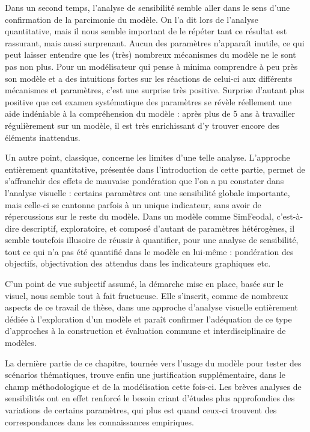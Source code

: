 Dans un second temps, l'analyse de sensibilité semble aller dans le sens d'une confirmation de la parcimonie du modèle.
On l'a dit lors de l'analyse quantitative, mais il nous semble important de le répéter tant ce résultat est rassurant, mais aussi surprenant.
Aucun des paramètres n'apparaît inutile, ce qui peut laisser entendre que les (très) nombreux mécanismes du modèle ne le sont pas non plus.
Pour un modélisateur qui pense à minima comprendre à peu près son modèle et a des intuitions fortes sur les réactions de celui-ci aux différents mécanismes et paramètres, c'est une surprise très positive.
Surprise d'autant plus positive que cet examen systématique des paramètres se révèle réellement une aide indéniable à la compréhension du modèle : après plus de 5 ans à travailler régulièrement sur un modèle, il est très enrichissant d'y trouver encore des éléments inattendus.

Un autre point, classique, concerne les limites d'une telle analyse.
L'approche entièrement quantitative, présentée dans l'introduction de cette partie, permet de s'affranchir des effets de mauvaise pondération que l'on a pu constater dans l'analyse visuelle : certains paramètres ont une sensibilité globale importante, mais celle-ci se cantonne parfois à un unique indicateur, sans avoir de répercussions sur le reste du modèle.
Dans un modèle comme SimFeodal, c'est-à-dire descriptif, exploratoire, et composé d'autant de paramètres hétérogènes, il semble toutefois illusoire de réussir à quantifier, pour une analyse de sensibilité, tout ce qui n'a pas été quantifié dans le modèle en lui-même : pondération des objectifs, objectivation des attendus dans les indicateurs graphiques etc.

C'un point de vue subjectif assumé, la démarche mise en place, basée sur le visuel, nous semble tout à fait fructueuse. 
Elle s'inscrit, comme de nombreux aspects de ce travail de thèse, dans une approche d'analyse visuelle entièrement dédiée à l'exploration d'un modèle et paraît confirmer l'adéquation de ce type d'approches à la construction et évaluation commune et interdisciplinaire de modèles.

La dernière partie de ce chapitre, tournée vers l'usage du modèle pour tester des scénarios thématiques, trouve enfin une justification supplémentaire, dans le champ méthodologique et de la modélisation cette fois-ci.
Les brèves analyses de sensibilités ont en effet renforcé le besoin criant d'études plus approfondies des variations de certains paramètres, qui plus est quand ceux-ci trouvent des correspondances dans les connaissances empiriques.

